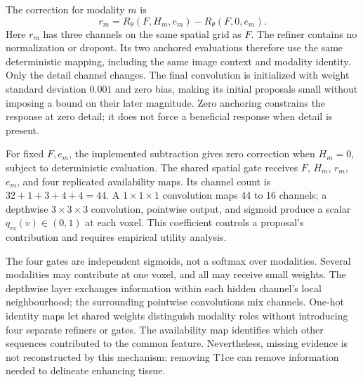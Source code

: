 \documentclass[conference]{IEEEtran}
\begin{document}
The correction for modality $m$ is
\begin{equation}
r_m=R_\theta(F,H_m,e_m)-R_\theta(F,0,e_m).
\label{eq:anchor}
\end{equation}
Here $r_m$ has three channels on the same spatial grid as $F$. The refiner contains no normalization or dropout. Its two anchored evaluations therefore use the same deterministic mapping, including the same image context and modality identity. Only the detail channel changes. The final convolution is initialized with weight standard deviation $0.001$ and zero bias, making its initial proposals small without imposing a bound on their later magnitude. Zero anchoring constrains the response at zero detail; it does not force a beneficial response when detail is present.

For fixed $F,e_m$, the implemented subtraction gives zero correction when $H_m=0$, subject to deterministic evaluation. The shared spatial gate receives $F$, $H_m$, $r_m$, $e_m$, and four replicated availability maps. Its channel count is $32+1+3+4+4=44$. A $1\times1\times1$ convolution maps 44 to 16 channels; a depthwise $3\times3\times3$ convolution, pointwise output, and sigmoid produce a scalar $q_m(v)\in(0,1)$ at each voxel. This coefficient controls a proposal's contribution and requires empirical utility analysis.

The four gates are independent sigmoids, not a softmax over modalities. Several modalities may contribute at one voxel, and all may receive small weights. The depthwise layer exchanges information within each hidden channel's local neighbourhood; the surrounding pointwise convolutions mix channels. One-hot identity maps let shared weights distinguish modality roles without introducing four separate refiners or gates. The availability map identifies which other sequences contributed to the common feature. Nevertheless, missing evidence is not reconstructed by this mechanism: removing T1ce can remove information needed to delineate enhancing tissue.
\end{document}
